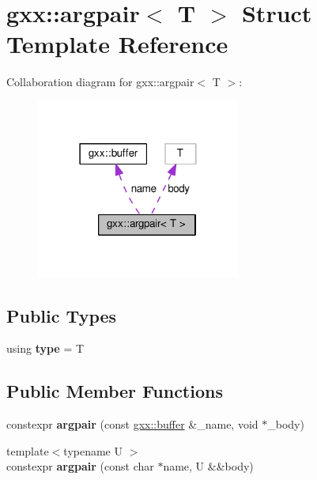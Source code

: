 \hypertarget{classgxx_1_1argpair}{}\section{gxx\+:\+:argpair$<$ T $>$ Struct Template Reference}
\label{classgxx_1_1argpair}


Collaboration diagram for gxx\+:\+:argpair$<$ T $>$\+:
\nopagebreak
\begin{figure}[H]
\begin{center}
\leavevmode
\includegraphics[width=190pt]{classgxx_1_1argpair__coll__graph}
\end{center}
\end{figure}
\subsection*{Public Types}
\begin{DoxyCompactItemize}
\item 
using {\bfseries type} = T\hypertarget{classgxx_1_1argpair_a313a7427a6e4731dc2670f45aa41a5c0}{}\label{classgxx_1_1argpair_a313a7427a6e4731dc2670f45aa41a5c0}

\end{DoxyCompactItemize}
\subsection*{Public Member Functions}
\begin{DoxyCompactItemize}
\item 
constexpr {\bfseries argpair} (const \hyperlink{classgxx_1_1buffer}{gxx\+::buffer} \&\+\_\+name, void $\ast$\+\_\+body)\hypertarget{classgxx_1_1argpair_a0b82346ee3a5d25f0fd72b6be1e1cdd7}{}\label{classgxx_1_1argpair_a0b82346ee3a5d25f0fd72b6be1e1cdd7}

\item 
{\footnotesize template$<$typename U $>$ }\\constexpr {\bfseries argpair} (const char $\ast$name, U \&\&body)\hypertarget{classgxx_1_1argpair_aa8f02dc6696b89d6c26f8ac10eb965a8}{}\label{classgxx_1_1argpair_aa8f02dc6696b89d6c26f8ac10eb965a8}

\end{DoxyCompactItemize}
